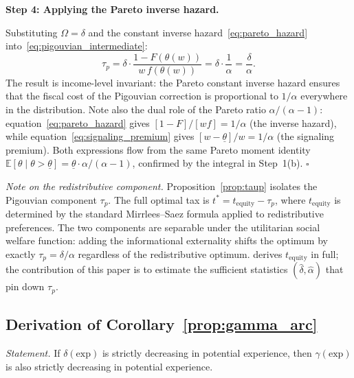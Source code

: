 \documentclass[12pt]{article}
\theoremstyle{definition}
\theoremstyle{remark}
\begin{document}
\medskip
\noindent \textbf{Step 4: Applying the Pareto inverse hazard.}

Substituting $\Omega = \delta$ and the constant inverse hazard~\eqref{eq:pareto_hazard}
into~\eqref{eq:pigouvian_intermediate}:
\begin{equation}
\tau_p = \delta \cdot \frac{1-F(\theta(w))}{w\,f(\theta(w))} = \delta \cdot \frac{1}{\alpha}
= \frac{\delta}{\alpha}.
\end{equation}
The result is income-level invariant: the Pareto constant inverse hazard ensures that the
fiscal cost of the Pigouvian correction is proportional to $1/\alpha$ everywhere in the
distribution. Note also the dual role of the Pareto ratio $\alpha/(\alpha-1)$:
equation~\eqref{eq:pareto_hazard} gives $[1-F]/[wf] = 1/\alpha$ (the inverse hazard), while
equation~\eqref{eq:signaling_premium} gives $[w - \underline{\theta}]/w = 1/\alpha$ (the
signaling premium). Both expressions flow from the same Pareto moment identity
$\mathbb{E}[\theta \mid \theta > \underline{\theta}] = \underline{\theta}\cdot\alpha/(\alpha-1)$,
confirmed by the integral in Step~1(b). $\square$

\medskip
\noindent\textit{Note on the redistributive component.} Proposition~\ref{prop:taup} isolates the
Pigouvian component $\tau_p$. The full optimal tax is $t^* = t_{\text{equity}} - \tau_p$, where
$t_{\text{equity}}$ is determined by the standard Mirrlees--Saez formula
\citep{mirrlees1971exploration, saez2001using} applied to redistributive preferences. The two
components are separable under the utilitarian social welfare function: adding the informational
externality shifts the optimum by exactly $\tau_p = \delta/\alpha$ regardless of the redistributive
optimum. \citet{sztutman2024} derives $t_{\text{equity}}$ in full; the contribution of this
paper is to estimate the sufficient statistics $(\hat\delta, \hat\alpha)$ that pin down $\tau_p$.

\bigskip

\subsection*{Derivation of Corollary~\ref{prop:gamma_arc}}

\noindent \textit{Statement.} If $\delta(\text{exp})$ is strictly decreasing in potential
experience, then $\gamma(\text{exp})$ is also strictly decreasing in potential experience.
\end{document}
